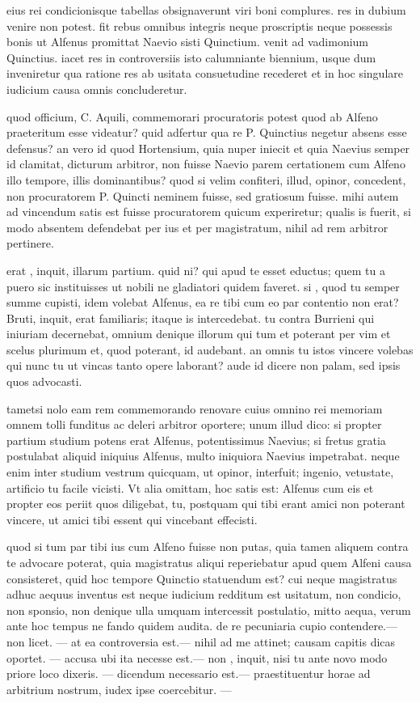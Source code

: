  eius rei condicionisque tabellas obsignaverunt viri boni complures. res in dubium venire non potest. fit rebus omnibus integris neque proscriptis neque possessis bonis ut Alfenus promittat Naevio sisti Quinctium. venit ad vadimonium Quinctius. iacet res in controversiis isto calumniante biennium, usque dum inveniretur qua ratione res ab usitata consuetudine recederet et in hoc singulare iudicium causa omnis concluderetur.

 quod officium, C. Aquili, commemorari procuratoris potest quod ab Alfeno praeteritum esse videatur? quid adfertur qua re P. Quinctius negetur absens esse defensus? an vero id quod Hortensium, quia nuper iniecit et quia Naevius semper id clamitat, dicturum arbitror, non fuisse Naevio parem certationem cum Alfeno illo tempore, illis dominantibus? quod si velim confiteri, illud, opinor, concedent, non procuratorem P. Quincti neminem fuisse, sed gratiosum fuisse. mihi autem ad vincendum satis est fuisse procuratorem quicum experiretur; qualis is fuerit, si modo absentem defendebat per ius et per magistratum, nihil ad rem arbitror pertinere.

 erat , inquit, illarum partium. quid ni? qui apud te esset eductus; quem tu a puero sic instituisses ut nobili ne gladiatori quidem faveret. si , quod tu semper summe cupisti, idem volebat Alfenus, ea re tibi cum eo par contentio non erat? Bruti, inquit, erat familiaris; itaque is intercedebat. tu contra Burrieni qui iniuriam decernebat, omnium denique illorum qui tum et poterant per vim et scelus plurimum et, quod poterant, id audebant. an omnis tu istos vincere volebas qui nunc tu ut vincas tanto opere laborant? aude id dicere non palam, sed ipsis quos advocasti.

 tametsi nolo eam rem commemorando renovare cuius omnino rei memoriam omnem tolli funditus ac deleri arbitror oportere; unum illud dico: si propter partium studium potens erat Alfenus, potentissimus Naevius; si fretus gratia postulabat aliquid iniquius Alfenus, multo iniquiora Naevius impetrabat. neque enim inter studium vestrum quicquam, ut opinor, interfuit; ingenio, vetustate, artificio tu facile vicisti. Vt alia omittam, hoc satis est: Alfenus cum eis et propter eos periit quos diligebat, tu, postquam qui tibi erant amici non poterant vincere, ut amici tibi essent qui vincebant effecisti.

 quod si tum par tibi ius cum Alfeno fuisse non putas, quia tamen aliquem contra te advocare poterat, quia magistratus aliqui reperiebatur apud quem Alfeni causa consisteret, quid hoc tempore Quinctio statuendum est? cui neque magistratus adhuc aequus inventus est neque iudicium redditum est usitatum, non condicio, non sponsio, non denique ulla umquam intercessit postulatio, mitto aequa, verum ante hoc tempus ne fando quidem audita. de re pecuniaria cupio contendere.— non licet. — at ea controversia est.— nihil ad me attinet; causam capitis dicas oportet. — accusa ubi ita necesse est.— non , inquit, nisi tu ante novo modo priore loco dixeris. — dicendum necessario est.— praestituentur horae ad arbitrium nostrum, iudex ipse coercebitur. —

